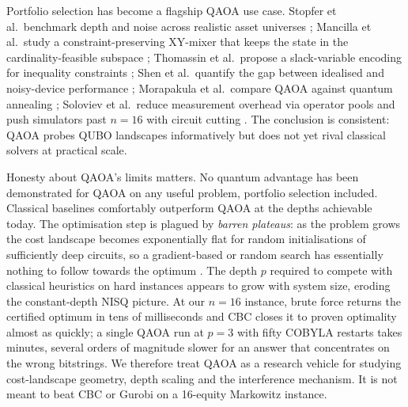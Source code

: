 Portfolio selection has become a flagship QAOA use case. Stopfer et al.\ benchmark depth and noise across realistic asset universes \parencite{stopfer2025benchmark}; Mancilla et al.\ study a constraint-preserving XY-mixer that keeps the state in the cardinality-feasible subspace \parencite{mancilla2026constrained}; Thomassin et al.\ propose a slack-variable encoding for inequality constraints \parencite{thomassin2025slack}; Shen et al.\ quantify the gap between idealised and noisy-device performance \parencite{shen2025noisy}; Morapakula et al.\ compare QAOA against quantum annealing \parencite{morapakula2025annealing}; Soloviev et al.\ reduce measurement overhead via operator pools \parencite{soloviev2025pauli} and push simulators past $n=16$ with circuit cutting \parencite{soloviev2025cutting}. The conclusion is consistent: QAOA probes QUBO landscapes informatively but does not yet rival classical solvers at practical scale.

Honesty about QAOA's limits matters. No quantum advantage has been demonstrated for QAOA on any useful problem, portfolio selection included. Classical baselines comfortably outperform QAOA at the depths achievable today. The optimisation step is plagued by \emph{barren plateaus}: as the problem grows the cost landscape becomes exponentially flat for random initialisations of sufficiently deep circuits, so a gradient-based or random search has essentially nothing to follow towards the optimum \parencite{mcclean2018barren}. The depth $p$ required to compete with classical heuristics on hard instances appears to grow with system size, eroding the constant-depth NISQ picture. At our $n=16$ instance, brute force returns the certified optimum in tens of milliseconds and CBC \parencite{forrest_cbc} closes it to proven optimality almost as quickly; a single QAOA run at $p=3$ with fifty COBYLA restarts takes minutes, several orders of magnitude slower for an answer that concentrates on the wrong bitstrings. We therefore treat QAOA as a research vehicle for studying cost-landscape geometry, depth scaling and the interference mechanism. It is not meant to beat CBC or Gurobi on a 16-equity Markowitz instance.

